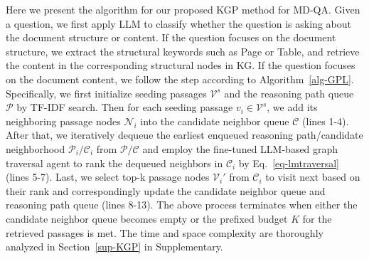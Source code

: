 Here we present the algorithm for our proposed KGP method for MD-QA. Given a question, we first apply LLM to classify whether the question is asking about the document structure or content. If the question focuses on the document structure, we extract the structural keywords such as Page or Table, and retrieve the content in the corresponding structural nodes in KG. If the question focuses on the document content, we follow the step according to Algorithm~\ref{alg-GPL}. Specifically, we first initialize seeding passages $\mathcal{V}^s$ and the reasoning path queue $\mathcal{P}$ by TF-IDF search. Then for each seeding passage $v_i \in \mathcal{V}^s$, we add its neighboring passage nodes $\mathcal{N}_i$ into the candidate neighbor queue $\mathcal{C}$ (lines 1-4).  After that, we iteratively dequeue the earliest enqueued reasoning path/candidate neighborhood $\mathcal{P}_i/\mathcal{C}_i$ from $\mathcal{P}/\mathcal{C}$ and employ the fine-tuned LLM-based graph traversal agent to rank the dequeued neighbors in $\mathcal{C}_i$ by Eq.~\eqref{eq-lmtraversal} (lines 5-7). Last, we select top-k passage nodes $\mathcal{V}_i'$ from $\mathcal{C}_i$ to visit next based on their rank and correspondingly update the candidate neighbor queue and reasoning path queue (lines 8-13). The above process terminates when either the candidate neighbor queue becomes empty or the prefixed budget $K$ for the retrieved passages is met. The time and space complexity are thoroughly analyzed in Section~\ref{sup-KGP} in Supplementary.